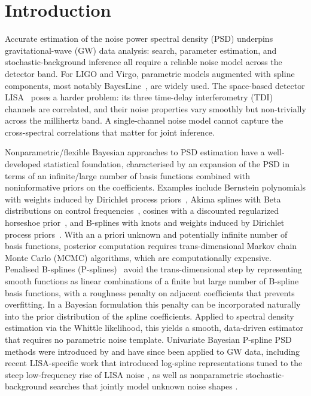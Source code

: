 \documentclass[%
	reprint,
	nofootinbib,
	amsmath,
	amssymb,
	aps,
]{revtex4-2}
\begin{document}
	\section{\label{sec:intro}Introduction}

	Accurate estimation of the noise power spectral density (PSD) underpins
	gravitational-wave (GW) data analysis: search, parameter estimation, and
	stochastic-background inference all require a reliable noise model across
	the detector band. For LIGO and Virgo, parametric models augmented with
	spline components, most notably BayesLine~\citep{littenberg_bayesian_2015}, are widely used.
	The space-based detector LISA~\citep{Amaro-SeoanePau2017LISA} poses a harder problem: its three
	time-delay interferometry (TDI) channels are correlated, and their noise
	properties vary smoothly but non-trivially across the millihertz band.
	A single-channel noise model cannot capture the cross-spectral correlations
	that matter for joint inference.

	Nonparametric/flexible Bayesian approaches to PSD estimation have a well-developed
	statistical foundation, characterised by an expansion of the PSD in terms of an
	infinite/large number of basis functions combined with noninformative priors on the
	coefficients. Examples include
	Bernstein polynomials with weights induced by Dirichlet process priors~\citep{10.1214/18-BA1126},
	Akima splines with Beta distributions on control frequencies~\citep{BaghiQuentin2023Ugbf},
	cosines with a discounted regularized horseshoe prior~\citep{PhysRevD.111.062003}, and
	B-splines with knots and weights induced by Dirichlet process priors~\citep{EdwardsMatthewC.2019Bnsd}.
	With an a priori unknown and potentially infinite number of basis functions, posterior
	computation requires trans-dimensional Markov chain Monte Carlo (MCMC) algorithms,
	which are computationally expensive. Penalised B-splines (P-splines)~\citep{EilersMarx1996}
	avoid the trans-dimensional step by representing smooth functions as linear combinations
	of a finite but large number of B-spline basis functions, with a roughness penalty on
	adjacent coefficients that prevents overfitting. In a Bayesian formulation this
	penalty can be incorporated naturally into the prior distribution of the
	spline coefficients. Applied to
	spectral density estimation via the Whittle likelihood, this yields a
	smooth, data-driven estimator that requires no parametric noise template.
	Univariate Bayesian P-spline PSD methods were introduced by
	\citet{maturana-russel_bayesian_2021} and have since been applied to GW
	data, including recent LISA-specific work that introduced log-spline
	representations tuned to the steep low-frequency rise of LISA noise
	\citep{aimen2026lisa}, as well as nonparametric stochastic-background
	searches that jointly model unknown noise shapes
	\citep{baghi2023sgwb,santini2025sgwb}.
\end{document}
